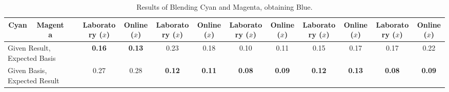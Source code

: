 \begin{itemize}
\begin{table}[H]
{\begin{tabular}{ccccccccccccc}
      Cyan & \multicolumn{1}{c|}{\cellcolor[HTML]{FFFFFF}Magenta} & \multicolumn{1}{c|}{\cellcolor[HTML]{0000FF}{\color[HTML]{FFFFFF}(18, 7, 95)}} & \cellcolor[HTML]{FFFFFF}Laboratory ($\overline{x}$) & \multicolumn{1}{c|}{\cellcolor[HTML]{FFFFFF}Online ($\overline{x}$)} & \cellcolor[HTML]{FFFFFF}Laboratory ($\overline{x}$) & \multicolumn{1}{c|}{\cellcolor[HTML]{FFFFFF}Online ($\overline{x}$)} & \cellcolor[HTML]{FFFFFF}Laboratory ($\overline{x}$) & \multicolumn{1}{c|}{\cellcolor[HTML]{FFFFFF}Online ($\overline{x}$)} & \cellcolor[HTML]{FFFFFF}Laboratory ($\overline{x}$) & \multicolumn{1}{c|}{\cellcolor[HTML]{FFFFFF}Online ($\overline{x}$)} & \cellcolor[HTML]{FFFFFF}Laboratory ($\overline{x}$) & \multicolumn{1}{c|}{Online ($\overline{x}$)} \\ \hline
      \multicolumn{3}{l|}{Given Result, Expected Basis}                                                                      & \textbf{0.16}                                    & \multicolumn{1}{c|}{\textbf{0.13}}                                & 0.23                                             & \multicolumn{1}{c|}{0.18}                                         & 0.10                                             & \multicolumn{1}{c|}{0.11}                                         & 0.15                                             & \multicolumn{1}{c|}{0.17}                                         & 0.17                                             & \multicolumn{1}{c|}{0.22}                 \\
      \multicolumn{3}{l|}{Given Basis, Expected Result}                                                                      & 0.27                                             & \multicolumn{1}{c|}{0.28}                                         & \textbf{0.12}                                    & \multicolumn{1}{c|}{\textbf{0.11}}                                & \textbf{0.08}                                    & \multicolumn{1}{c|}{\textbf{0.09}}                                & \textbf{0.12}                                    & \multicolumn{1}{c|}{\textbf{0.13}}                                & \textbf{0.08}                                    & \multicolumn{1}{c|}{\textbf{0.09}}        \\ \hline
    \end{tabular}}
    \caption[Results of Blending Cyan and Magenta, obtaining Blue.]{Results of Blending Cyan and Magenta, obtaining Blue.}
    \vspace{-5pt}
    \label{table:cyanmagenta_blue_analysis}
  \end{table}

\end{itemize}
